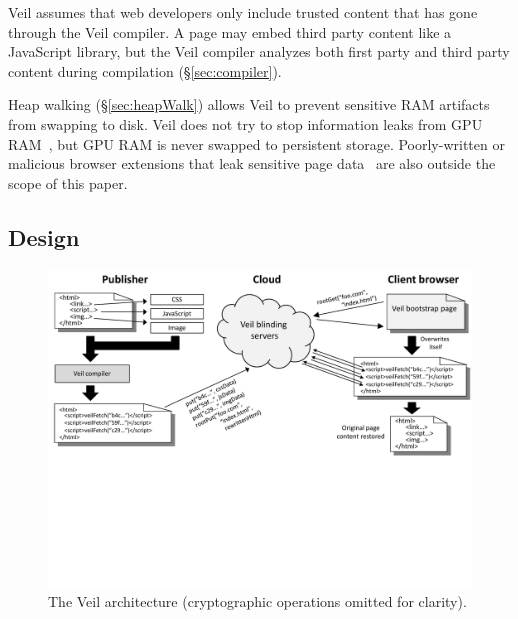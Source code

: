 Veil assumes that web developers only include
trusted content that has gone through the Veil
compiler.
A page may embed third party content like a JavaScript
library, but the Veil compiler analyzes both
first party and third party content during compilation
(\S\ref{sec:compiler}).

Heap walking (\S\ref{sec:heapWalk}) allows Veil
to prevent sensitive RAM artifacts from swapping to
disk. Veil does not try to stop information
leaks from GPU RAM~\cite{lee2014}, but GPU RAM
is never swapped to persistent storage. 
Poorly-written or malicious browser extensions that leak
sensitive page data~\cite{lerner13} are also outside the
scope of this paper.

\subsection{Design}
\label{sec:design}

\begin{figure}[t!]
	\centering
	\includegraphics[width=\textwidth]{veil-figs/arch_small_cropped}
	\caption{The Veil architecture (cryptographic operations omitted for clarity).}
	\label{fig:arch}
\end{figure}

